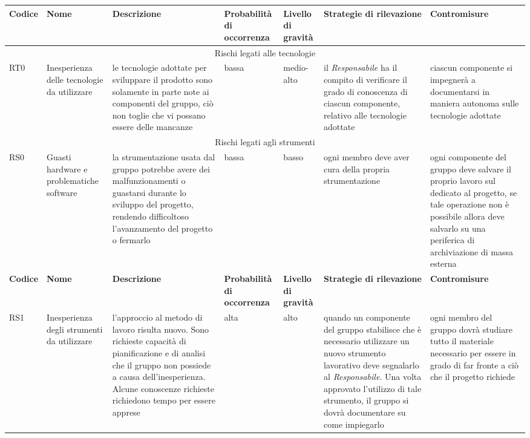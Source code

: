 \documentclass[../PianodiProgetto.tex]{subfiles}
\begin{document}
\setlength\LTleft{-35.5mm}
\raggedleft
	\begin{longtable}{|p{15mm}|p{23.5mm}|p{38mm}|p{22mm}|p{19mm}|p{30mm}|p{30mm}|}
		\hline \textbf{Codice} & \textbf{Nome} & \textbf{Descrizione} & \textbf{Probabilità di occorrenza} & \textbf{Livello di gravità} & \textbf{Strategie di rilevazione} & \textbf{Contromisure} \\
		
		\hline\multicolumn{7}{|c|}{Rischi legati alle tecnologie} \\
		
		\hline RT0 & Inesperienza delle tecnologie da utilizzare & le tecnologie adottate per sviluppare il prodotto sono solamente in parte note ai componenti del gruppo, ciò non toglie che vi possano essere delle mancanze & bassa & medio-alto & il \textit{Responsabile} ha il compito di verificare il grado di conoscenza di ciascun componente, relativo alle tecnologie adottate & ciascun componente si impegnerà a documentarsi in maniera autonoma sulle tecnologie adottate \\
		
		\hline\multicolumn{7}{|c|}{Rischi legati agli strumenti} \\
		
		\hline RS0 & Guasti hardware e problematiche software & la strumentazione usata dal gruppo potrebbe avere dei malfunzionamenti o guastarsi durante lo sviluppo del progetto, rendendo difficoltoso l'avanzamento del progetto o fermarlo & bassa & basso & ogni membro deve aver cura della propria strumentazione & ogni componente del gruppo deve salvare il proprio lavoro sul \glossario{repository}{Repository} \glossario{GitHub}{GitHub} dedicato al progetto, se tale operazione non è possibile allora deve salvarlo su una periferica di archiviazione di massa esterna \\
		\hline
	
	\newpage
	
		\hline \textbf{Codice} & \textbf{Nome} & \textbf{Descrizione} & \textbf{Probabilità di occorrenza} & \textbf{Livello di gravità} & \textbf{Strategie di rilevazione} & \textbf{Contromisure} \\
		
		\hline RS1 & Inesperienza degli strumenti da utilizzare &  l'approccio al metodo di lavoro risulta nuovo. Sono richieste capacità di pianificazione e di analisi che il gruppo non possiede a causa dell'inesperienza. Alcune conoscenze richieste richiedono tempo per essere apprese & alta & alto & quando un componente del gruppo stabilisce che è necessario utilizzare un nuovo strumento lavorativo deve segnalarlo al  \textit{Responsabile}. Una volta approvato l'utilizzo di tale strumento, il gruppo si dovrà documentare su come impiegarlo & ogni membro del gruppo dovrà studiare tutto il materiale necessario per essere in grado di far fronte  a ciò che il progetto richiede \\
		

\end{longtable}
\end{document}
